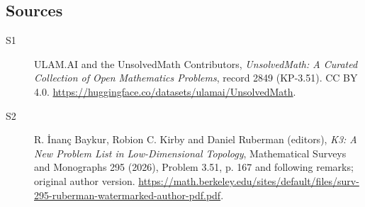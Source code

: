 \documentclass[11pt]{article}
\begin{document}
\subsection{Sources}
\begin{description}
\item[\hypertarget{source:2849:1}{S1}] ULAM.AI and the UnsolvedMath Contributors, \emph{UnsolvedMath: A Curated Collection of Open Mathematics Problems}, record 2849 (KP-3.51). CC BY 4.0. \url{https://huggingface.co/datasets/ulamai/UnsolvedMath}.
\item[\hypertarget{source:2849:2}{S2}] R. İnanç Baykur, Robion C. Kirby and Daniel Ruberman (editors), \emph{K3: A New Problem List in Low-Dimensional Topology}, Mathematical Surveys and Monographs 295 (2026), Problem 3.51, p. 167 and following remarks; original author version. \url{https://math.berkeley.edu/sites/default/files/surv-295-ruberman-watermarked-author-pdf.pdf}.
\end{description}
\label{end:2849}
\end{document}

